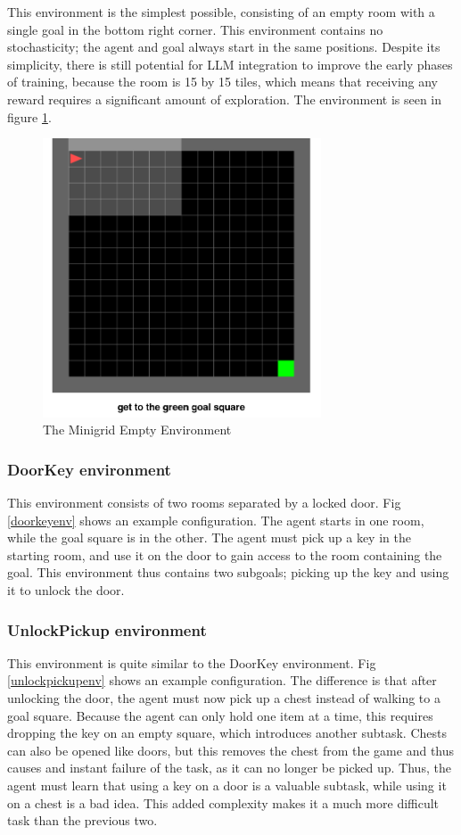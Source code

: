 \documentclass[conference]{IEEEtran}
\begin{document}
This environment is the simplest possible, consisting of an empty room with a single goal in the bottom right corner. This environment contains no stochasticity; the agent and goal always start in the same positions. Despite its simplicity, there is still potential for LLM integration to improve the early phases of training, because the room is 15 by 15 tiles, which means that receiving any reward requires a significant amount of exploration. The environment is seen in figure \ref{emptyenv}.

\begin{figure}[h]
\centerline{\includegraphics[width=3.25in]{figure/emptyenv.png}}
\caption{The Minigrid Empty Environment}
\label{emptyenv}
\end{figure}

\subsubsection{DoorKey environment}

This environment consists of two rooms separated by a locked door. Fig \ref{doorkeyenv} shows an example configuration. The agent starts in one room, while the goal square is in the other. The agent must pick up a key in the starting room, and use it on the door to gain access to the room containing the goal. This environment thus contains two subgoals; picking up the key and using it to unlock the door.

\subsubsection{UnlockPickup environment}

This environment is quite similar to the DoorKey environment. Fig \ref{unlockpickupenv} shows an example configuration. The difference is that after unlocking the door, the agent must now pick up a chest instead of walking to a goal square. Because the agent can only hold one item at a time, this requires dropping the key on an empty square, which introduces another subtask. Chests can also be opened like doors, but this removes the chest from the game and thus causes and instant failure of the task, as it can no longer be picked up. Thus, the agent must learn that using a key on a door is a valuable subtask, while using it on a chest is a bad idea. This added complexity makes it a much more difficult task than the previous two.
\end{document}
